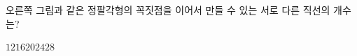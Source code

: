 \noindent\begin{minipage}[t]{0.58\linewidth}\vspace{0pt}\raggedright 오른쪽 그림과 같은 정팔각형의 꼭짓점을 이어서 만들 수 있는 서로 다른 직선의 개수는?\end{minipage}\hfill\begin{minipage}[t]{0.4\linewidth}\vspace{0pt}\centering \resizebox{\ifdim\width>\linewidth\linewidth\else\width\fi}{!}{}\end{minipage}\par
\begin{choices32}{$12$}{$16$}{$20$}{$24$}{$28$}\end{choices32}
